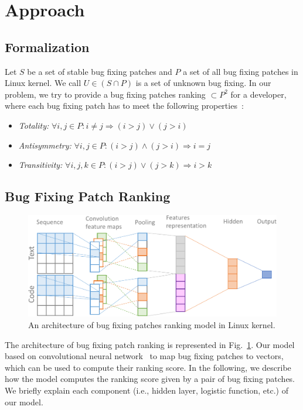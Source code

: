 \section{Approach}
\label{sec:approach}
\subsection{Formalization}
\label{sec:formalization}

Let $S$ be a set of stable bug fixing patches and $P$ a set of all bug fixing patches in Linux kernel. We call $U \in (S \cap P ) $ is a set of unknown bug fixing. In our problem, we try to provide a bug fixing patches ranking $\subset P^2$ for a developer, where each bug fixing patch has to meet the following properties~\cite{rendle2009bpr}:
\begin{itemize}
	\item \textit{Totality:} $\forall i,j \in P: i \neq j \Rightarrow (i > j) \vee (j > i)$
	\item \textit{Antisymmetry:} $\forall i,j \in P: (i > j) \wedge (j > i) \Rightarrow i = j$ 
	\item \textit{Transitivity:} $\forall i,j,k \in P: (i > j) \vee (j > k) \Rightarrow i > k$ 
\end{itemize}

\subsection{Bug Fixing Patch Ranking}
\label{sec:bugranking}
\begin{figure}[t!]
	\centering
	\includegraphics[width=1.0\textwidth]{BugPatchingRanking_v3-cropped.pdf}
	\caption{An architecture of bug fixing patches ranking model in Linux kernel.}
	\label{fig:bugranking}
\end{figure}

The architecture of bug fixing patch ranking is represented in Fig.~\ref{fig:bugranking}. Our model based on convolutional neural network~\cite{lecun1995convolutional} to map bug fixing patches to vectors, which can be used to compute their ranking score. In the following, we describe how the model computes the ranking score given by a pair of bug fixing patches. We briefly explain each component (i.e., hidden layer, logistic function, etc.) of our model.

